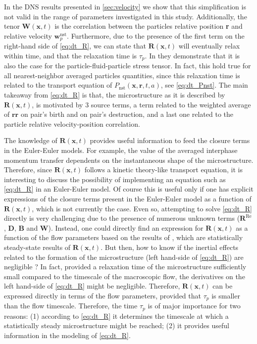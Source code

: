In the DNS results presented in \ref{sec:velocity} we show that this simplification is not valid in the range of parameters investigated in this study.
Additionally, the tenor $\textbf{W}(\textbf{x},t)$ is the correlation between the particles relative position \textbf{r} and relative velocity $\textbf{w}_p^\text{nst}$.
Furthermore, due to the presence of the first term on the right-hand side of \ref{eq:dt_R}, we can state that $\textbf{R}(\textbf{x},t)$ will eventually relax within time, and that the relaxation time is $\tau_p$. 
In \citet{zhang2023evolution} they demonstrate that it is also the case for the particle-fluid-particle stress tensor.
In fact, this hold true for all nearest-neighbor averaged particles quantities, since this relaxation time is related to the transport equation of $P_\text{nst}(\textbf{x},\textbf{r},t,a)$, see \ref{eq:dt_Pnst}.
The main takeaway from \ref{eq:dt_R} is that, the microstructure as it is described by $\textbf{R}(\textbf{x},t)$, is motivated by 3 source terms, a term related to the weighted average of $\textbf{rr}$ on pair's birth and on pair's destruction, and a last one related to the particle relative velocity-position correlation. 


The knowledge of $\textbf{R}(\textbf{x},t)$ provides useful information to feed the closure terms in the Euler-Euler models.
For example, the value of the averaged interphase momentum transfer dependents on the instantaneous shape of the microstructure. 
Therefore, since $\textbf{R}(\textbf{x},t)$ follows a kinetic theory-like transport equation, it is interesting to discuss the possibility of implementing an equation such as \ref{eq:dt_R} in an Euler-Euler model. 
Of course this is useful only if one has explicit expressions of the closure terms present in the Euler-Euler model as a function of $\textbf{R}(\textbf{x},t)$, which is not currently the case.
Even so, attempting to solve \ref{eq:dt_R} directly is very challenging due to the presence of numerous unknown terms ($\textbf{R}^\text{Re}$, $\textbf{D}$, $\textbf{B}$ and $\textbf{W}$).
Instead, one could directly find an expression for $\textbf{R}(\textbf{x},t)$ as a function of the flow parameters based on the results of \citet{fintzi2024buoyancy}, which are statistically steady-state results of $\textbf{R}(\textbf{x},t)$. 
But then, how to know if the inertial effects related to the formation of the microstructure  (left hand-side of \ref{eq:dt_R}) are negligible ?
In fact, provided a relaxation time of the microstructure sufficiently small compared to the timescale of the macroscopic flow, the derivatives on the left hand-side of \ref{eq:dt_R} might be negligible.
Therefore, $\textbf{R}(\textbf{x},t)$ can be expressed directly in terms of the flow parameters, provided that $\tau_p$ is smaller than the flow timescale. 
Therefore, the time $\tau_p$ is of major importance for two reasons: 
(1) according to \ref{eq:dt_R} it determines the timescale at which a statistically steady microstructure might be reached; 
(2) it provides useful information in the modeling of \ref{eq:dt_R}.


